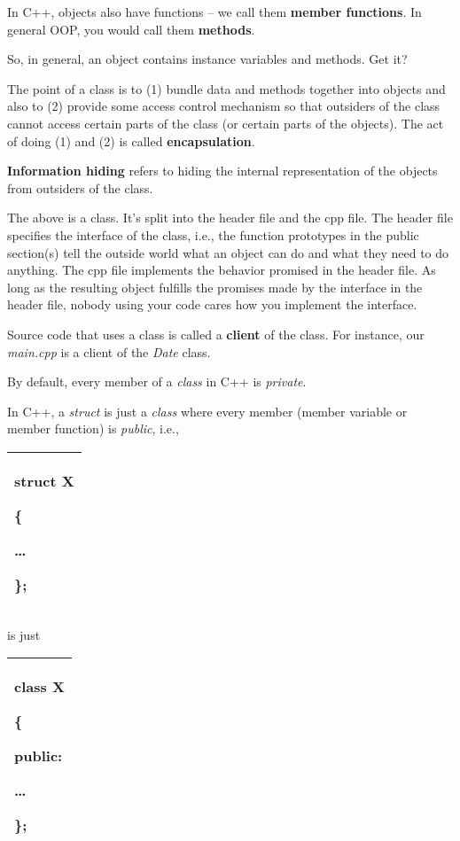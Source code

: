 \documentclass[
]{article}
\begin{document}
In C++, objects also have functions -- we call them \textbf{member
functions}. In general OOP, you would call them \textbf{methods}.

So, in general, an object contains instance variables and methods. Get
it?

The point of a class is to (1) bundle data and methods together into
objects and also to (2) provide some access control mechanism so that
outsiders of the class cannot access certain parts of the class (or
certain parts of the objects). The act of doing (1) and (2) is called
\textbf{encapsulation}.

\textbf{Information hiding} refers to hiding the internal representation
of the objects from outsiders of the class.

The above is a class. It's split into the header file and the cpp file.
The header file specifies the interface of the class, i.e., the function
prototypes in the public section(s) tell the outside world what an
object can do and what they need to do anything. The cpp file implements
the behavior promised in the header file. As long as the resulting
object fulfills the promises made by the interface in the header file,
nobody using your code cares how you implement the interface.

Source code that uses a class is called a \textbf{client} of the
class.\textbf{ }For instance, our \emph{main.cpp} is a client of the
\emph{Date} class.

By default, every member of a \emph{class} in C++ is \emph{private}.

In C++, a \emph{struct} is just a \emph{class} where every member
(member variable or member function) is \emph{public}, i.e.,

\begin{longtable}[]{@{}l@{}}
\toprule
\endhead
\begin{minipage}[t]{0.97\columnwidth}\raggedright
\textbf{struct} X

\{

\ldots{}

\};\strut
\end{minipage}\tabularnewline
\bottomrule
\end{longtable}

is just

\begin{longtable}[]{@{}l@{}}
\toprule
\endhead
\begin{minipage}[t]{0.97\columnwidth}\raggedright
\textbf{class} X

\{

public:

\ldots{}

\};\strut
\end{minipage}\tabularnewline
\bottomrule
\end{longtable}
\end{document}
